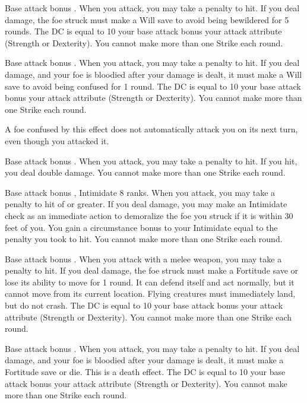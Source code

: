 \featpre Base attack bonus .
\featben When you attack, you may take a  penalty to hit. If you deal damage, the foe struck must make a Will save to avoid being bewildered for 5 rounds. The DC is equal to 10 \add your base attack bonus \add your attack attribute (Strength or Dexterity). You cannot make more than one Strike each round.

\featpre Base attack bonus .
\featben When you attack, you may take a  penalty to hit. If you deal damage, and your foe is bloodied after your damage is dealt, it must make a Will save to avoid being confused for 1 round. The DC is equal to 10 \add your base attack bonus \add your attack attribute (Strength or Dexterity). You cannot make more than one Strike each round.

\confusionexplanation A foe confused by this effect does not automatically attack you on its next turn, even though you attacked it.

\featpre Base attack bonus .
\featben When you attack, you may take a  penalty to hit. If you hit, you deal double damage. You cannot make more than one Strike each round.

\featpres Base attack bonus , Intimidate 8 ranks.
\featben When you attack, you may take a penalty to hit of  or greater. If you deal damage, you may make an Intimidate check as an immediate action to demoralize the foe you struck if it is within 30 feet of you. You gain a circumstance bonus to your Intimidate equal to the penalty you took to hit. You cannot make more than one Strike each round.

\featpre Base attack bonus .
\featben When you attack with a melee weapon, you may take a  penalty to hit. If you deal damage, the foe struck must make a Fortitude save or lose its ability to move for 1 round. It can defend itself and act normally, but it cannot move from its current location. Flying creatures must immediately land, but do not crash. The DC is equal to 10 \add your base attack bonus \add your attack attribute (Strength or Dexterity). You cannot make more than one Strike each round.

\featpre Base attack bonus .
\featben When you attack, you may take a  penalty to hit. If you deal damage, and your foe is bloodied after your damage is dealt, it must make a Fortitude save or die. This is a death effect. The DC is equal to 10 \add your base attack bonus \add your attack attribute (Strength or Dexterity). You cannot make more than one Strike each round.

